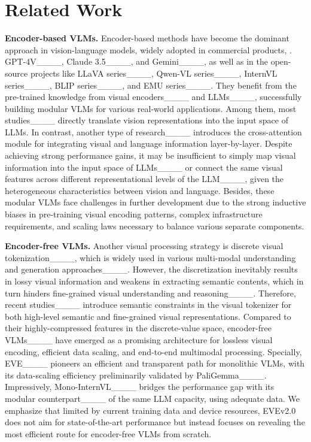 \section{Related Work}
\label{sec:Related-work}

\textbf{Encoder-based VLMs.} 
Encoder-based methods have become the dominant approach in vision-language models, widely adopted in commercial products, \eg. GPT-4V____, Claude 3.5____, and Gemini____, as well as in the open-source projects like LLaVA series____, Qwen-VL series____, InternVL series____, BLIP series____, and EMU series____. They benefit from the pre-trained knowledge from visual encoders____ and LLMs____, successfully building modular VLMs for various real-world applications. Among them, most studies____ directly translate vision representations into the input space of LLMs.
%
In contrast, another type of research____ introduces the cross-attention module for integrating visual and language information layer-by-layer.
%
Despite achieving strong performance gains, it may be insufficient to simply map visual information into the input space of LLMs____ or connect the same visual features across different representational levels of the LLM____, given the heterogeneous characteristics between vision and language. 
%
Besides, these modular VLMs face challenges in further development due to the strong inductive biases in pre-training visual encoding patterns, complex infrastructure requirements, and scaling laws necessary to balance various separate components.



\noindent\textbf{Encoder-free VLMs.} 
Another visual processing strategy is discrete visual tokenization____, which is widely used in various multi-modal understanding and generation approaches____.
However, the discretization inevitably results in lossy visual information and weakens in extracting semantic contents, which in turn hinders fine-grained visual understanding and reasoning____.
%
Therefore, recent studies____ introduce semantic constraints in the visual tokenizer for both high-level semantic and fine-grained visual representations.
%
Compared to their highly-compressed features in the discrete-value space, encoder-free VLMs____ have emerged as a promising architecture for lossless visual encoding, efficient data scaling, and end-to-end multimodal processing. 
%
Specially, EVE____ pioneers an efficient and transparent path for monolithic VLMs, with its data-scaling efficiency preliminarily validated by PaliGemma____. Impressively, Mono-InternVL____ bridges the performance gap with its modular counterpart____ of the same LLM capacity, using adequate data. We emphasize that limited by current training data and device resources, EVEv2.0 does not aim for state-of-the-art performance but instead focuses on revealing the most efficient route for encoder-free VLMs from scratch.

